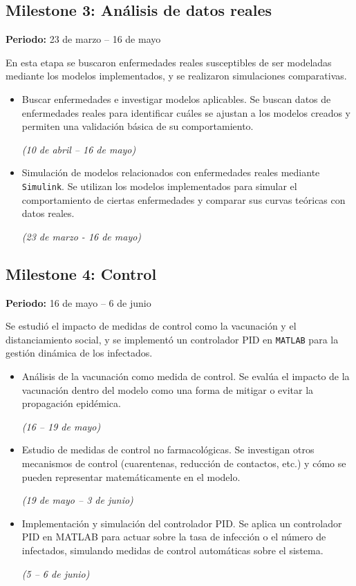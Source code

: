 \subsection*{Milestone 3: Análisis de datos reales}
\textbf{Periodo:} 23 de marzo – 16 de mayo

En esta etapa se buscaron enfermedades reales susceptibles de ser modeladas mediante los modelos implementados, y se realizaron simulaciones comparativas.

\begin{itemize}
    \item Buscar enfermedades e investigar modelos aplicables.
    Se buscan datos de enfermedades reales para identificar cuáles se ajustan a los modelos creados y permiten una validación básica de su comportamiento. 
    
    \textit{(10 de abril – 16 de mayo)}
    \item Simulación de modelos relacionados con enfermedades reales mediante \texttt{Simulink}. Se utilizan los modelos implementados para simular el comportamiento de ciertas enfermedades y comparar sus curvas teóricas con datos reales.

    
    \textit{(23 de marzo - 16 de mayo)}
\end{itemize}

\subsection*{Milestone 4: Control}
\textbf{Periodo:} 16 de mayo – 6 de junio

Se estudió el impacto de medidas de control como la vacunación y el distanciamiento social, y se implementó un controlador PID en \texttt{MATLAB} para la gestión dinámica de los infectados.

\begin{itemize}
    \item Análisis de la vacunación como medida de control. Se evalúa el impacto de la vacunación dentro del modelo como una forma de mitigar o evitar la propagación epidémica. 
    
    \textit{(16 – 19 de mayo)}
    \item Estudio de medidas de control no farmacológicas. Se investigan otros mecanismos de control (cuarentenas, reducción de contactos, etc.) y cómo se pueden representar matemáticamente en el modelo. 
    
    \textit{(19 de mayo – 3 de junio)}
    \item Implementación y simulación del controlador PID. Se aplica un controlador PID en MATLAB para actuar sobre la tasa de infección o el número de infectados, simulando medidas de control automáticas sobre el sistema.
    
    \textit{(5 – 6 de junio)}
\end{itemize}

